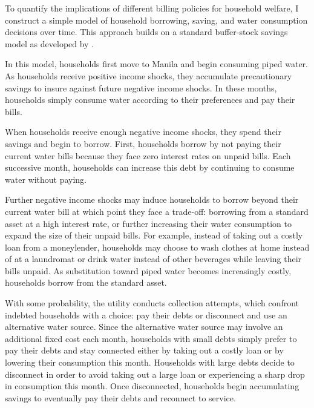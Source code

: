 \documentclass[12pt]{article}
\begin{document}

To quantify the implications of different billing policies for household welfare, I construct a simple model of household borrowing, saving, and water consumption decisions over time.  This approach builds on a standard buffer-stock savings model as developed by \cite{deaton1991saving}.

In this model, households first move to Manila and begin consuming piped water.  As households receive positive income shocks, they accumulate precautionary savings to insure against future negative income shocks.  In these months, households simply consume water according to their preferences and pay their bills.

When households receive enough negative income shocks, they spend their savings and begin to borrow.  First, households borrow by not paying their current water bills because they face zero interest rates on unpaid bills.  Each successive month, households can increase this debt by continuing to consume water without paying.

Further negative income shocks may induce households to borrow beyond their current water bill at which point they face a trade-off: borrowing from a standard asset at a high interest rate, or further increasing their water consumption to expand the size of their unpaid bills.  For example, instead of taking out a costly loan from a moneylender, households may choose to wash clothes at home instead of at a laundromat or drink water instead of other beverages while leaving their bills unpaid.  As substitution toward piped water becomes increasingly costly, households borrow from the standard asset.

With some probability, the utility conducts collection attempts, which confront indebted households with a choice: pay their debts or disconnect and use an alternative water source.  Since the alternative water source may involve an additional fixed cost each month, households with small debts simply prefer to pay their debts and stay connected either by taking out a costly loan or by lowering their consumption this month.  Households with large debts decide to disconnect in order to avoid taking out a large loan or experiencing a sharp drop in consumption this month.  Once disconnected, households begin accumulating savings to eventually pay their debts and reconnect to service.
\end{document}
